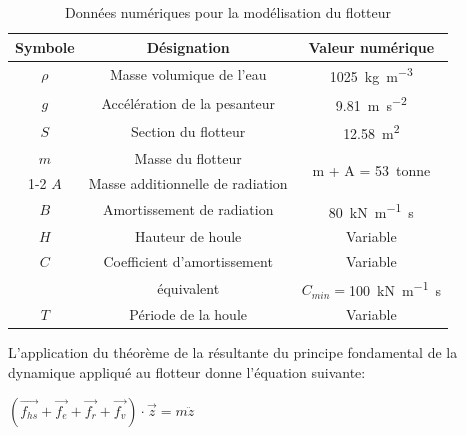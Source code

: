 \begin{table}[ht!]
\begin{center}
\begin{tabular}{|c|c|c|}
\hline
Symbole & Désignation & Valeur numérique\\
\hline
$\rho$ & Masse volumique de l'eau & \SI{1 025}{\kg\m^{-3}}\\
\hline
$g$ & Accélération de la pesanteur & \SI{9,81}{\m\s^{-2}}\\
\hline
$S$ & Section du flotteur & \SI{12,58}{\m^2}\\
\hline
$m$ & Masse du flotteur & \multirow{2}{*}{m + A = \SI{53}{tonne}} \\
\cline{1-2}
$A$ & Masse additionnelle de radiation & \\
\hline
$B$ & Amortissement de radiation & \SI{80}{\kN\m^{-1}\s}\\
\hline
$H$ & Hauteur de houle & Variable\\
\hline
$C$ & Coefficient d'amortissement & Variable\\
 & équivalent & $C_{min}=$\SI{100}{\kN\m^{-1}\s}\\
\hline
$T$ & Période de la houle & Variable\\
\hline
\end{tabular}
\end{center}
  \caption{Données numériques pour la modélisation du flotteur}
\label{tab02}
\end{table}

L'application du théorème de la résultante du principe fondamental de la dynamique appliqué au flotteur donne l'équation suivante:
\begin{center}
$\left(\overrightarrow{f_{hs}}+\overrightarrow{f_{e}}+\overrightarrow{f_{r}}+\overrightarrow{f_{v}}\right)\cdot\overrightarrow{z}=m\ddot{z}$
\end{center}




